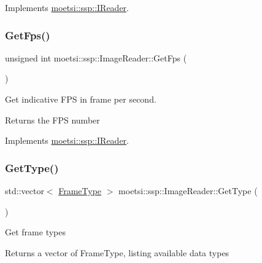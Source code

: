 Implements \hyperlink{classmoetsi_1_1ssp_1_1IReader_ac292d83eb06dee277baaa06e281a562d}{moetsi\+::ssp\+::\+I\+Reader}.

\mbox{\label{classmoetsi_1_1ssp_1_1ImageReader_a86adfec8106c366aaf1ec63e2a7da156}} 
\subsubsection{\texorpdfstring{Get\+Fps()}{GetFps()}}
{\footnotesize\ttfamily unsigned int moetsi\+::ssp\+::\+Image\+Reader\+::\+Get\+Fps (\begin{DoxyParamCaption}{ }\end{DoxyParamCaption})\hspace{0.3cm}{\ttfamily [virtual]}}

Get indicative F\+PS in frame per second. \begin{DoxyReturn}{Returns}
the F\+PS number 
\end{DoxyReturn}


Implements \hyperlink{classmoetsi_1_1ssp_1_1IReader_a9f6a8650ca290b011b8e5451eeae9f32}{moetsi\+::ssp\+::\+I\+Reader}.

\mbox{\label{classmoetsi_1_1ssp_1_1ImageReader_af6f66957b6e3268c5336f4176c77fc73}} 
\subsubsection{\texorpdfstring{Get\+Type()}{GetType()}}
{\footnotesize\ttfamily std\+::vector$<$ \hyperlink{namespacemoetsi_1_1ssp_a46efdfa2cd5a28ead465dcc8006b5a87}{Frame\+Type} $>$ moetsi\+::ssp\+::\+Image\+Reader\+::\+Get\+Type (\begin{DoxyParamCaption}{ }\end{DoxyParamCaption})\hspace{0.3cm}{\ttfamily [virtual]}}

Get frame types \begin{DoxyReturn}{Returns}
a vector of Frame\+Type, listing available data types 
\end{DoxyReturn}


